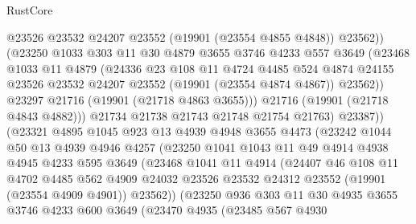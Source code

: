 \begin{lexlean}{RustCore}
\begin{coremodule}
                    @23526
                    @23532
                    @24207
                    @23552
                    (@19901 (@23554 @4855 @4848))
                    @23562))
                (@23250
                  @1033
                  @303
                  @11
                  @30
                  @4879
                  @3655
                  @3746
                  @4233
                  @557
                  @3649
                  (@23468
                    @1033
                    @11
                    @4879
                    (@24336
                      @23
                      @108
                      @11
                      @4724
                      @4485
                      @524
                      @4874
                      @24155
                      @23526
                      @23532
                      @24207
                      @23552
                      (@19901 (@23554 @4874 @4867))
                      @23562))
                  @23297
                  @21716
                  (@19901 (@21718 @4863 @3655)))
                @21716
                (@19901 (@21718 @4843 @4882)))
              @21734
              @21738
              @21743
              @21748
              @21754
              @21763)
            @23387))
        (@23321
          @4895
          @1045
          @923
          @13
          @4939
          @4948
          @3655
          @4473
          (@23242
            @1044
            @50
            @13
            @4939
            @4946
            @4257
            (@23250
              @1041
              @1043
              @11
              @49
              @4914
              @4938
              @4945
              @4233
              @595
              @3649
              (@23468
                @1041
                @11
                @4914
                (@24407
                  @46
                  @108
                  @11
                  @4702
                  @4485
                  @562
                  @4909
                  @24032
                  @23526
                  @23532
                  @24312
                  @23552
                  (@19901 (@23554 @4909 @4901))
                  @23562))
              (@23250
                @936
                @303
                @11
                @30
                @4935
                @3655
                @3746
                @4233
                @600
                @3649
                (@23470
                  @4935
                  (@23485
                    @567
                    @4930

\end{coremodule}
\end{lexlean}
